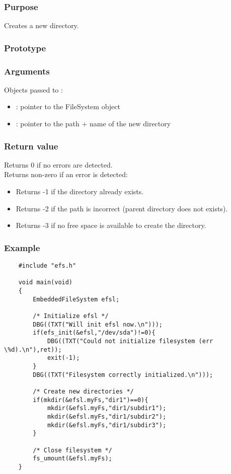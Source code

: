 \subsubsection*{Purpose}
Creates a new directory.
\subsubsection*{Prototype}
\subsubsection*{Arguments}
Objects passed to :
\begin{itemize}
	\item{: pointer to the FileSystem object}
	\item{: pointer to the path + name of the new directory}
\end{itemize}
\subsubsection*{Return value}
Returns 0 if no errors are detected.\\
\newline
Returns non-zero if an error is detected:
\begin{itemize}
	\item{Returns -1 if the directory already exists.}
	\item{Returns -2 if the path is incorrect (parent directory does not exists).}
	\item{Returns -3 if no free space is available to create the directory.}
\end{itemize}
\subsubsection*{Example}
\lstset{numbers=left, stepnumber=1, numberstyle=\small, numbersep=5pt, tabsize=4}
\begin{lstlisting}
	#include "efs.h"

	void main(void)
	{
		EmbeddedFileSystem efsl;

		/* Initialize efsl */
		DBG((TXT("Will init efsl now.\n")));
		if(efs_init(&efsl,"/dev/sda")!=0){
			DBG((TXT("Could not initialize filesystem (err \%d).\n"),ret));
			exit(-1);
		}
		DBG((TXT("Filesystem correctly initialized.\n")));

		/* Create new directories */
		if(mkdir(&efsl.myFs,"dir1")==0){
			mkdir(&efsl.myFs,"dir1/subdir1");
			mkdir(&efsl.myFs,"dir1/subdir2");
			mkdir(&efsl.myFs,"dir1/subdir3");
		}

		/* Close filesystem */
		fs_umount(&efsl.myFs);
	}
\end{lstlisting}
